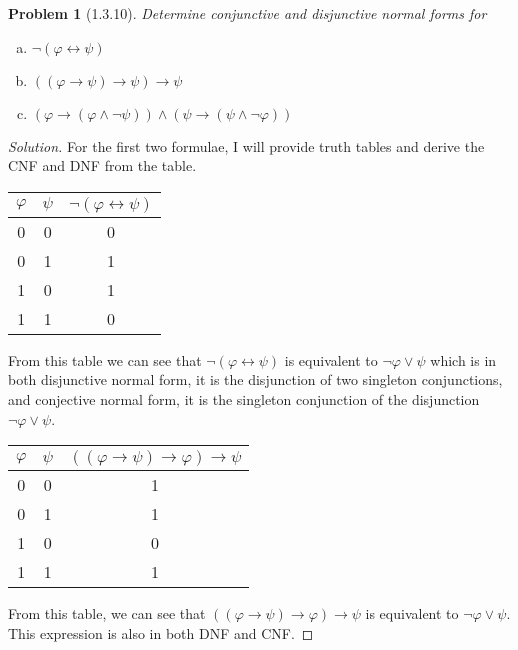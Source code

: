 \documentclass[letter]{article}
\newtheorem{problem}{Problem}
\theoremstyle{definition}
\newenvironment{solution}
{\begin{proof}[Solution]}
        {\end{proof}}
\renewcommand{\phi}{\varphi}
\begin{document}
\begin{problem}[1.3.10] Determine conjunctive and disjunctive normal forms for
\begin{enumerate}[(a)]
    \item $\neg (\phi \leftrightarrow \psi)$
    \item $((\phi \to \psi) \to \psi) \to \psi$
    \item $(\phi \to (\phi \land \neg \psi)) \land (\psi \to (\psi \land \neg \phi))$
\end{enumerate}
\end{problem}
\begin{solution}
For the first two formulae, I will provide truth tables and derive the CNF and DNF from the table.\\
\begin{center}
\begin{tabular}{|c|c|c|}
  \hline
  $\phi$ & $\psi$ & $\lnot (\phi \leftrightarrow \psi)$\\
  \hline
  0 & 0 & 0 \\
  \hline
  0 & 1 & 1 \\
  \hline
  1 & 0 & 1\\
  \hline
  1 & 1 & 0\\
  \hline
\end{tabular}
\end{center}

From this table we can see that $\lnot (\phi \leftrightarrow \psi)$ is equivalent to $\lnot \phi \lor \psi$ which is in both disjunctive normal form, it is the disjunction of two singleton conjunctions, and conjective normal form, it is the singleton conjunction of the disjunction $\lnot \phi \lor \psi$.

\begin{center}
\begin{tabular}{|c|c|c|}
  \hline
  $\phi$ & $\psi$ & $((\phi \to \psi) \to \phi) \to \psi$\\
  \hline
  0 & 0 & 1 \\
  \hline
  0 & 1 & 1 \\
  \hline
  1 & 0 & 0\\
  \hline
  1 & 1 & 1\\
  \hline
\end{tabular}
\end{center}

From this table, we can see that  $((\phi \to \psi) \to \phi) \to \psi$ is equivalent to $\lnot \phi \lor \psi$. This expression is also in both DNF and CNF.


\end{solution}
\end{document}
